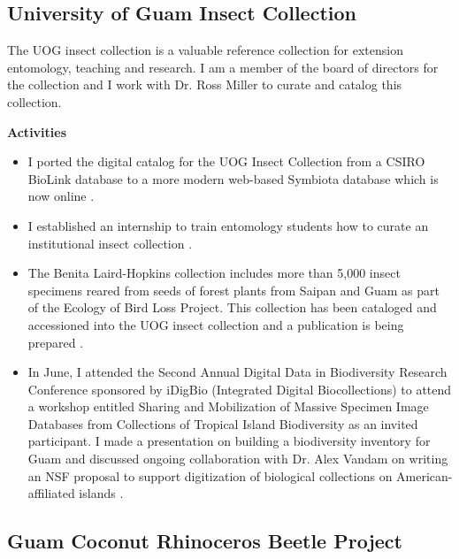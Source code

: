 \documentclass[12pt,english]{scrartcl}
\newcommand{\activities}{\medskip\textbf{Activities}}
\begin{document}
\subsection{University of Guam Insect Collection}
\begin{refsection}

The UOG insect collection is a valuable reference collection for extension
entomology, teaching and research. I am a member of the board of directors
for the collection and I work with Dr. Ross Miller to curate and catalog
this collection.

\activities

\begin{itemize}

\item I ported the digital catalog for the UOG Insect Collection from a
CSIRO BioLink database to a more modern web-based Symbiota database
which is now online \cite{moore_scan_2018}.

\item I established an internship to train entomology students how to curate
an institutional insect collection \cite{moore_internship_2018}.

\item The Benita Laird-Hopkins collection includes more than 5,000 insect
specimens reared from seeds of forest plants from Saipan and Guam
as part of the Ecology of Bird Loss Project. This collection has been
cataloged and accessioned into the UOG insect collection and a publication
is being prepared \cite{laird-hopkins_[preparation]_2018}.

\item In June, I attended the Second Annual Digital Data in Biodiversity
Research Conference sponsored by iDigBio (Integrated Digital Biocollections)
to attend a workshop entitled Sharing and Mobilization of Massive
Specimen Image Databases from Collections of Tropical Island Biodiversity
as an invited participant. I made a presentation on building a biodiversity
inventory for Guam \cite{moore_building_2018-1} and discussed ongoing
collaboration with Dr. Alex Vandam on writing an NSF proposal to support
digitization of biological collections on American-affiliated islands
\cite{moore_trip_2018}.
\end{itemize}

\printbibliography

\end{refsection}

\subsection{Guam Coconut Rhinoceros Beetle Project}
\end{document}
